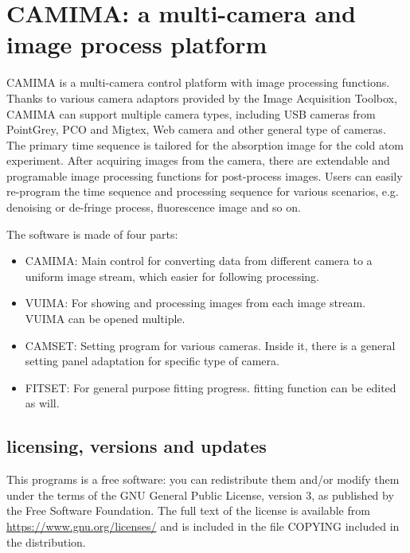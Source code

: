 \section{CAMIMA: a multi-camera and image process platform}
\label{sec:camima}

CAMIMA is a multi-camera control platform with image processing functions. Thanks to various camera adaptors provided by the Image Acquisition Toolbox, CAMIMA can support multiple camera types, including USB cameras from PointGrey, PCO and Migtex, Web camera and other general type of cameras. The primary time sequence is tailored for the absorption image for the cold atom experiment. After acquiring images from the camera, there are extendable and programable image processing functions for post-process images. Users can easily re-program the time sequence and processing sequence for various scenarios, e.g. denoising or de-fringe process, fluorescence image and so on.

The software is made of four parts: 
\begin{itemize}[noitemsep,topsep=0pt]
\item CAMIMA: Main control for converting data from different camera to a uniform image stream, which easier for following processing.
\item VUIMA: For showing and processing images from each image stream. VUIMA can be opened multiple.
\item CAMSET: Setting program for various cameras. Inside it, there is a general setting panel adaptation for specific type of camera.
\item FITSET: For general purpose fitting progress. fitting function can be edited as will.
\end{itemize}

\subsection{licensing, versions and updates}
This programs is a free software: you can redistribute them and/or modify them under the terms of the GNU General Public License, version 3, as published by the Free Software Foundation. The full text of the license is available from \href{https://www.gnu.org/licenses/}{https://www.gnu.org/licenses/} and is included in the file COPYING included in the distribution.

